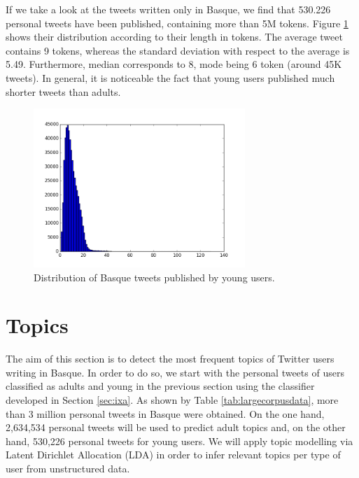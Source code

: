 \documentclass[information,article,submit,moreauthors,pdftex,10pt,a4paper]{Definitions/mdpi}
\begin{document}
If we take a look at the tweets written only in Basque, we find that 530.226 personal tweets have been published, containing more than 5M tokens. Figure  \ref{fig:txio luze gzt} shows their distribution according to their length in tokens. The average tweet contains 9 tokens, whereas the standard deviation with respect to the average is 5.49. Furthermore, median corresponds to 8, mode being 6 token (around 45K tweets). In general, it is noticeable the fact that young users published much shorter tweets than adults.

\begin{figure}[H]
  \centering
  \includegraphics[height=6cm]{graf_inf}
  \caption{Distribution of Basque tweets published by young users.}
  \label{fig:txio luze gzt}
\end{figure}



\section{Topics}\label{sec:topics}

The aim of this section is to detect the most frequent topics of Twitter users writing in Basque. In order to do so, we start with the personal tweets of users classified as adults and young in the previous section using the classifier developed in Section \ref{sec:ixa}. As shown by Table \ref{tab:largecorpusdata}, more than 3 million personal tweets in Basque were obtained. On the one hand, 2,634,534 personal tweets will be used to predict adult topics and, on the other hand, 530,226 personal tweets for young users. We will apply topic modelling via Latent Dirichlet Allocation (LDA) \cite{blei2003latent} in order to infer relevant topics per type of user from unstructured data.
\end{document}

